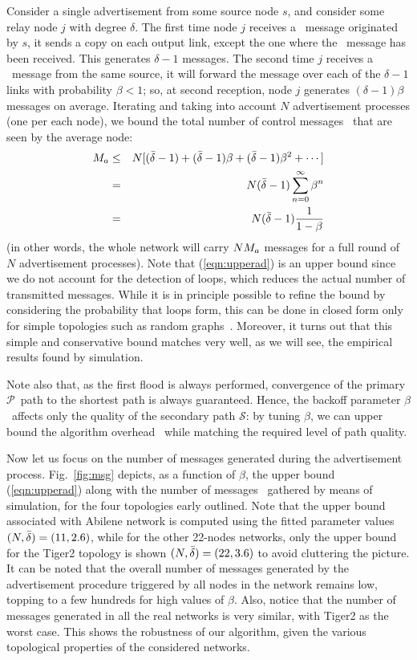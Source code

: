 \documentclass[conference]{IEEEtran}
\newcommand{\N}{N}
\newcommand{\PA}{\ensuremath{\mathcal{P}}}
\newcommand{\SE}{\ensuremath{\mathcal{S}}}
\newcommand{\Be}{\ensuremath{\beta}} \newcommand{\ML}{\ensuremath{\kappa}} \newcommand{\PB}{\ensuremath{p_b}}
\newcommand{\FW}{\text{ADV}}
\begin{document}
Consider a single advertisement from some source node $s$, and consider some relay node $j$ with degree $\delta$. The first time node $j$ receives a \FW\ message originated by $s$, it sends a copy on each output link, except the one where the \FW\ message has been received. This generates  $\delta-1$ messages. The second time $j$ receives a \FW\ message from the same source, it will forward the message over each of the $\delta-1$ links with probability $\Be<1$; so, at second reception, node  $j$ generates $(\delta-1)\beta$ messages on average. 
Iterating and taking into account $N$ advertisement processes (one per each node), we bound the total number of control messages \nm\ that are seen by the average node:
\begin{eqnarray}
\nm 	&\leq&	\N[(\degr-1)+(\degr-1)\Be+(\degr-1)\Be^2+\cdots] \nonumber \\
	&=&	\N(\degr-1)\sum_{n=0}^{\infty}\Be^n	\nonumber \\
	&=&	\N(\degr-1)\frac{1}{1-\Be}
\label{eqn:upperad}
\end{eqnarray}
(in other words, the whole network will carry $NM_a$ messages for a full round of $N$ advertisement processes). Note  that  (\ref{eqn:upperad}) is an upper bound since we do not account for  the detection of loops, which  reduces  the actual number of transmitted messages. While it is in principle  possible to refine the bound by considering the probability that loops form, this can  be done in closed form only for simple topologies such as random graphs~\cite{janson94graphs}.
Moreover, it turns out that this simple and conservative bound  matches very well, as we will see, the empirical results found by simulation.  

Note also that, as the first flood is always performed, convergence of the primary \PA\ path to the shortest path is always guaranteed. Hence, the backoff parameter \Be\ affects only the quality of the  secondary path \SE: by tuning \Be,  we can upper bound the algorithm overhead \nm\  while  matching the required level of path quality.

Now let us focus on the number of messages generated during the advertisement process.
Fig.~\ref{fig:msg} depicts, as a function of \Be, the upper bound (\ref{eqn:upperad})  along with the number of messages  \nm\ gathered by means of simulation, for the four topologies early outlined.   Note that the upper bound
associated with  Abilene network is computed using the fitted parameter values $(N,\bar{\delta})=(11,2.6)$, while for the other 22-nodes networks, only the upper bound for the Tiger2 topology is shown $(N,\bar{\delta})=(22,3.6)$ to avoid cluttering the picture. It can be noted that the overall number of messages generated by the advertisement procedure triggered by all nodes in the network remains low, topping to a few hundreds for high values of \Be. Also, notice that the number of messages generated in all the real networks is very similar, with Tiger2 as the worst case. This shows the robustness of our algorithm, given the various  topological properties of the considered networks.
\end{document}
